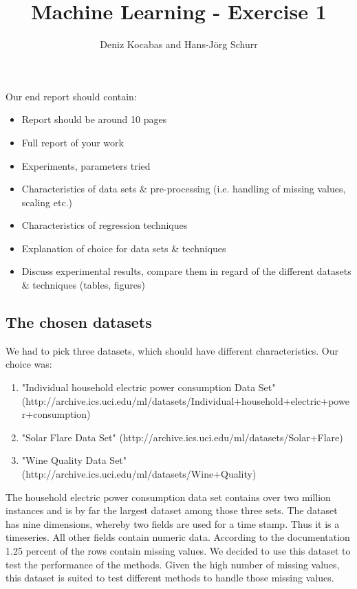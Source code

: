 \documentclass[a4paper]{article}
\begin{document}
\title{Machine Learning - Exercise 1 }
\author{Deniz Kocabas and Hans-Jörg Schurr}

\maketitle
\tableofcontents
\newpage

Our end report should contain:

\begin{itemize}
	\item Report should be around 10 pages
	\item Full report of your work
	\item Experiments, parameters tried
	\item Characteristics of data sets \& pre-processing (i.e.
handling of missing values, scaling etc.)
	\item Characteristics of regression techniques
    \item Explanation of choice for data sets \& techniques
	\item Discuss experimental results, compare them in regard of
the different datasets \& techniques (tables, figures)
\end{itemize}

\subsection{The chosen datasets}
We had to pick three datasets, which should have different characteristics. 
Our choice was:
\begin{enumerate}
    \item "Individual household electric power consumption Data Set"
        (http://archive.ics.uci.edu/ml/datasets/Individual+household+electric+power+consumption)
    \item "Solar Flare Data Set"
        (http://archive.ics.uci.edu/ml/datasets/Solar+Flare)
    \item "Wine Quality Data Set"
        (http://archive.ics.uci.edu/ml/datasets/Wine+Quality)
\end{enumerate}
The household electric power consumption data set contains over two million
instances and is by far the largest dataset among those three sets. The dataset
has nine dimensions, whereby two fields are used for a time stamp. Thus it is a
timeseries. All other fields contain numeric data. According to the
documentation 1.25 percent of the rows contain missing values. We decided to use
this dataset to test the performance of the methods. Given the high number of
missing values, this dataset is suited to test different methods to handle those
missing values.
\end{document}
